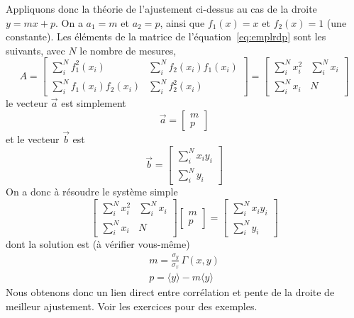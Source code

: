 Appliquons donc la théorie de l'ajustement ci-dessus au cas de la droite $y=mx+p$. On a $a_1=m$ et $a_2=p$, ainsi que $f_1(x)=x$ et $f_2(x)=1$ (une constante). Les éléments de la matrice de l'équation~\ref{eq:emplrdp} sont les suivants, avec $N$ le nombre de mesures,
\begin{equation}
A=
\begin{bmatrix}
\sum_i^N f_1^2(x_i) & \sum_i^N f_2(x_i)f_1(x_i)\\
\sum_i^N f_1(x_i)f_{2}(x_i) & \sum_i^N f_{2}^2(x_i)
\end{bmatrix}=
\begin{bmatrix}
\sum_i^N x_i^2 & \sum_i^N x_i\\
\sum_i^N x_i & N
\end{bmatrix}
\end{equation}
le vecteur $\vec{a}$ est simplement
\begin{equation}
\vec{a}=
\begin{bmatrix}
m \\ p
\end{bmatrix}
\end{equation}
et le vecteur $\vec{b}$ est
\begin{equation}
\vec{b}=
\begin{bmatrix}
\sum_i^N x_iy_i \\ \sum_i^N y_i
\end{bmatrix}
\end{equation}
On a donc à résoudre le système simple
\begin{equation}
\begin{bmatrix}
\sum_i^N x_i^2 & \sum_i^N x_i\\
\sum_i^N x_i & N
\end{bmatrix}
\begin{bmatrix}
m \\ p
\end{bmatrix}
=
\begin{bmatrix}
\sum_i^N x_iy_i \\ \sum_i^N y_i
\end{bmatrix}
\end{equation}
dont la solution est (à vérifier vous-même)
\begin{gather}
m=\frac{\sigma_y}{\sigma_x}\,\Gamma(x,y)\\
p=\langle y\rangle-m\langle y\rangle
\end{gather}
Nous obtenons donc un lien direct entre corrélation et pente de la droite de meilleur ajustement. Voir les exercices pour des exemples.

